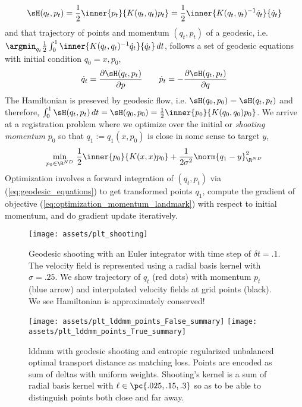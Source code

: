 \documentclass[11pt]{article}
\begin{document}
\begin{align}
    \sH(q_t,p_t)
        = \frac{1}{2} \inner{p_t}{K(q_t,q_t)p_t}
        = \frac{1}{2} \inner{K(q_t, q_t)^{-1} \dot{q}_t}{\dot{q}_t}
\end{align}
and that trajectory of points and momentum $(q_t,p_t)$ of a geodesic, i.e. $\argmin_{q_t} \frac{1}{2}\int_0^1 \inner{K(q_t, q_t)^{-1} \dot{q}_t}{\dot{q}_t} \, dt$, follows a set of geodesic equations with initial condition $q_0 = x, p_0$,
\begin{align}
    \dot{q}_t
        = \frac{\partial \sH(q_t,p_t)}{\partial p}
    \quad\quad
    \dot{p}_t
        = - \frac{\partial \sH(q_t,p_t)}{\partial q}
    \label{eq:geodesic_equations}
\end{align}
The Hamiltonian is preseved by geodesic flow, i.e. $\sH(q_0,p_0) = \sH(q_t,p_t)$ and therefore, $\int_0^1 \sH(q_t,p_t) \, dt = \sH(q_0, p_0) = \frac{1}{2} \inner{ p_0 }{ K(q_0,q_0) p_0 }$. We arrive at a registration problem where we optimize over the initial or \textit{shooting momentum} $p_0$ so that $q_1 := q_1(x,p_0)$ is close in some sense to target $y$,
\begin{align}
    \min_{p_0\in\R^{ND}} \,
        \frac{1}{2} \inner{ p_0 }{ K(x,x) p_0 } + \frac{1}{2\sigma^2} \norm{q_1 - y}_{\R^{ND}}^2
    \label{eq:optimization_momentum_landmark}
\end{align}
Optimization involves a forward integration of $(q_t,p_t)$ via (\ref{eq:geodesic_equations}) to get transformed points $q_1$, compute the gradient of objective (\ref{eq:optimization_momentum_landmark}) with respect to initial momentum, and do gradient update iteratively.


\begin{center} 
\begin{figure}[h!]
    \texttt{[image: assets/plt\_shooting]} 
    \caption{Geodesic shooting with an Euler integrator with time step of $\delta t = .1$. The velocity field is represented using a radial basis kernel with $\sigma=.25$. We show trajectory of $q_t$ (red dots) with momentum $p_t$ (blue arrow) and interpolated velocity fields at grid points (black). We see Hamiltonian is approximately conserved!}
    \label{fig:plt_shooting}
\end{figure} 
\end{center} 
 
\begin{center} 
\begin{figure}[h!]
    \texttt{[image: assets/plt\_lddmm\_points\_False\_summary]} 
    \texttt{[image: assets/plt\_lddmm\_points\_True\_summary]} 
    \caption{lddmm with geodesic shooting and entropic regularized unbalanced optimal transport distance as matching loss. Points are encoded as sum of deltas with uniform weights. Shooting's kernel is a sum of radial basis kernel with $\ell \in \pc{.025,.15,.3}$ so as to be able to distinguish points both close and far away. }
    \label{fig:plt_lddmm_points}
\end{figure}
\end{center} 
    
  



\newpage
\printbibliography 
\end{document}
